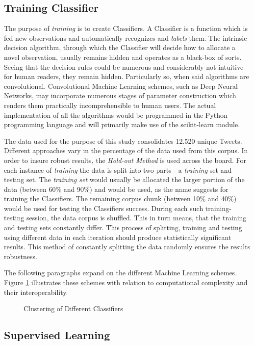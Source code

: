 	\subsection{Training Classifier}
	The purpose of \textit{training} is to create Classifiers. A Classifier is a function which is fed  new observations and automatically recognizes and \textit{labels} them. The intrinsic decision algorithm, through which the Classifier will decide how to allocate a novel observation, usually remains hidden and operates as a black-box of sorts. Seeing that the decision rules could be numerous and considerably not intuitive for human readers, they remain hidden. Particularly so, when said algorithms are convolutional. Convolutional Machine Learning schemes, such as Deep Neural Networks, may incorporate numerous stages of parameter construction which renders them practically incomprehensible to human users. The actual implementation of all the algorithms would be programmed in the Python programming language and will primarily make use of the scikit-learn\cite{scikit-learn} module.
	\par
	The data used for the purpose of this study consolidates 12.520 unique Tweets. Different approaches vary in the percentage of the data used from this corpus. In order to insure robust results, the \textit{Hold-out Method} is used across the board. For each instance of \textit{training} the data is split into two parts - a \textit{training} set and testing set. The \textit{training set} would usually be allocated the larger portion of the data (between 60\% and 90\%) and would be used, as the name suggests for training the Classifiers. The remaining corpus chunk (between 10\% and 40\%) would be used for testing the Classifiers success. During each such training-testing session, the data corpus is shuffled. This in turn means, that the training and testing sets constantly differ. This process of splitting, training and testing using different data in each iteration should produce statistically significant results. This method of constantly splitting the data randomly ensures the results robustness.
	\par
	The following paragraphs expand on the different Machine Learning schemes. Figure \ref{fig:classifier_matrix} illustrates these schemes with relation to computational complexity and their interoperability.
	
	\begin{figure}[h]
		\centering
		\scalebox{.8}{}
		\captionsetup{width=0.8\textwidth}
		\caption{Clustering of Different Classifiers}
		\label{fig:classifier_matrix}
	\end{figure}
	
	\subsection{Supervised Learning}
	\label{classifer_types}
	
	
	
	
	
	

	
	
	
	
	
	
	
	
	
	
	
	
		
	